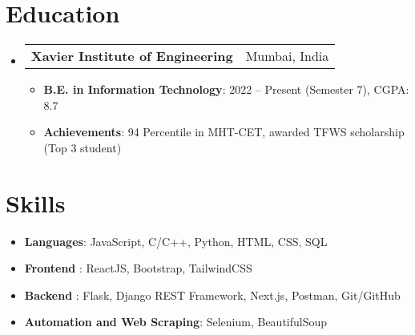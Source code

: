 \documentclass[letterpaper,10pt]{article}
\makeatletter
\newcommand{\resumeItem}[2]{
  \item\small{
    \textbf{#1}{: #2 \vspace{-2pt}}
  }
}
\newcommand{\resumeSubheading}[2]{
  \vspace{-1pt}\item
    \begin{tabular*}{0.97\textwidth}{l@{\extracolsep{\fill}}r}
      \textbf{#1} & #2 \\
    \end{tabular*}\vspace{-4pt}
}
\newcommand{\resumeSubHeadingListStart}{\begin{itemize}[leftmargin=*]}
\newcommand{\resumeSubHeadingListEnd}{\end{itemize}}
\newcommand{\resumeItemListStart}{\begin{itemize}}
\newcommand{\resumeItemListEnd}{\end{itemize}\vspace{-4pt}}
\makeatother
\begin{document}
\begin{itemize}





\end{itemize}

\section{Education}
\resumeSubHeadingListStart
  \resumeSubheading{Xavier Institute of Engineering}{Mumbai, India}
    \resumeItemListStart
      \resumeItem{B.E. in Information Technology}{2022 -- Present (Semester 7), CGPA: 8.7}
      \resumeItem{Achievements}{94 Percentile in MHT-CET, awarded TFWS scholarship (Top 3 student)}
    \resumeItemListEnd
\resumeSubHeadingListEnd

\section{Skills}
\resumeSubHeadingListStart
  \resumeItem{Languages}{JavaScript, C/C++, Python, HTML, CSS, SQL}
  \resumeItem{Frontend }{ReactJS, Bootstrap, TailwindCSS}
  \resumeItem{Backend }{Flask, Django REST Framework, Next.js, Postman, Git/GitHub}
  \resumeItem{Automation and Web Scraping}{Selenium, BeautifulSoup}
\resumeSubHeadingListEnd
\end{document}

